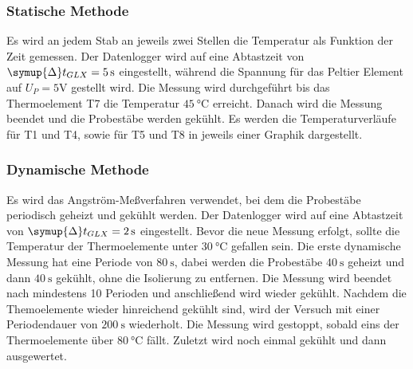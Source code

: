\subsubsection{Statische Methode}
Es wird an jedem Stab an jeweils zwei Stellen die Temperatur als Funktion der Zeit gemessen. 
Der Datenlogger wird auf eine Abtastzeit von $\symup{\Delta} t_{GLX}=\SI{5}{\second}$ eingestellt, während die Spannung für das Peltier Element auf $U_P=5\si{\volt}$ gestellt wird.
Die Messung wird durchgeführt bis das Thermoelement T7 die Temperatur $\SI{45}{\celsius}$ erreicht. Danach wird die Messung beendet und die Probestäbe werden gekühlt.
Es werden die Temperaturverläufe für T1 und T4, sowie für T5 und T8 in jeweils einer Graphik dargestellt.
\subsubsection{Dynamische Methode}
Es wird das Angström-Meßverfahren verwendet, bei dem die Probestäbe periodisch geheizt und gekühlt werden.
Der Datenlogger wird auf eine Abtastzeit von $\symup{\Delta}t_{GLX}=\SI{2}{\second}$ eingestellt.
Bevor die neue Messung erfolgt, sollte die Temperatur der Thermoelemente unter $\SI{30}{\celsius}$ gefallen sein.
Die erste dynamische Messung hat eine Periode von $\SI{80}{\second}$, dabei werden die Probestäbe $\SI{40}{\second}$ geheizt und dann $\SI{40}{\second}$ gekühlt, ohne die Isolierung zu entfernen.
Die Messung wird beendet nach mindestens 10 Perioden und anschließend wird wieder gekühlt.
Nachdem die Themoelemente wieder hinreichend gekühlt sind, wird der Versuch mit einer Periodendauer von $\SI{200}{\second}$ wiederholt.
Die Messung wird gestoppt, sobald eins der Thermoelemente über $\SI{80}{\celsius}$ fällt.
Zuletzt wird noch einmal gekühlt und dann ausgewertet.